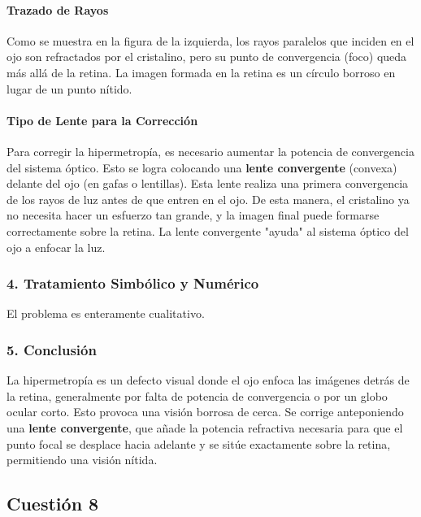 \paragraph*{Trazado de Rayos}
Como se muestra en la figura de la izquierda, los rayos paralelos que inciden en el ojo son refractados por el cristalino, pero su punto de convergencia (foco) queda más allá de la retina. La imagen formada en la retina es un círculo borroso en lugar de un punto nítido.

\paragraph*{Tipo de Lente para la Corrección}
Para corregir la hipermetropía, es necesario aumentar la potencia de convergencia del sistema óptico. Esto se logra colocando una \textbf{lente convergente} (convexa) delante del ojo (en gafas o lentillas). Esta lente realiza una primera convergencia de los rayos de luz antes de que entren en el ojo. De esta manera, el cristalino ya no necesita hacer un esfuerzo tan grande, y la imagen final puede formarse correctamente sobre la retina. La lente convergente "ayuda" al sistema óptico del ojo a enfocar la luz.

\subsubsection*{4. Tratamiento Simbólico y Numérico}
El problema es enteramente cualitativo.

\subsubsection*{5. Conclusión}
\begin{cajaconclusion}
La hipermetropía es un defecto visual donde el ojo enfoca las imágenes detrás de la retina, generalmente por falta de potencia de convergencia o por un globo ocular corto. Esto provoca una visión borrosa de cerca. Se corrige anteponiendo una \textbf{lente convergente}, que añade la potencia refractiva necesaria para que el punto focal se desplace hacia adelante y se sitúe exactamente sobre la retina, permitiendo una visión nítida.
\end{cajaconclusion}

\newpage
\subsection{Cuestión 8}
\label{subsec:C8_2021_jul_ext}

